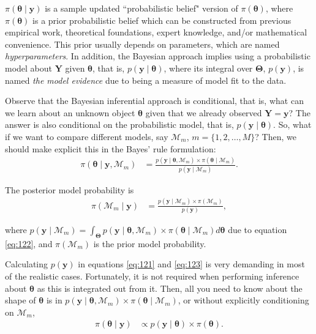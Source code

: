 \(\pi(\bm{\theta} \mid \mathbf{y})\) is a sample updated ``probabilistic belief" version of \(\pi(\bm{\theta})\), where \(\pi(\bm{\theta})\) is a prior probabilistic belief which can be constructed from previous empirical work, theoretical foundations, expert knowledge, and/or mathematical convenience. This prior usually depends on parameters, which are named \textit{hyperparameters}. In addition, the Bayesian approach implies using a probabilistic model about \(\mathbf{Y}\) given \(\bm{\theta}\), that is, \(p(\mathbf{y} \mid \bm{\theta})\), where its integral over \(\mathbf{\Theta}\), \(p(\mathbf{y})\), is named \textit{the model evidence} due to being a measure of model fit to the data.

Observe that the Bayesian inferential approach is conditional, that is, what can we learn about an unknown object \(\bm{\theta}\) given that we already observed \(\bm Y =\mathbf{y}\)? The answer is also conditional on the probabilistic model, that is, \(p(\mathbf{y} \mid \bm{\theta})\). So, what if we want to compare different models, say \(\mathcal{M}_m\), \(m = \{1,2,\dots,M\}\)? Then, we should make explicit this in the Bayes' rule formulation:
\begin{align}
	\pi(\bm{\theta}\mid \mathbf{y},\mathcal{M}_m)&=\frac{p(\mathbf{y}\mid \bm{\theta},\mathcal{M}_m) \times \pi(\bm{\theta}\mid \mathcal{M}_m)}{p(\mathbf{y}\mid \mathcal{M}_m)}.
	\label{eq:122}
\end{align}

The posterior model probability is
\begin{align}
	\pi(\mathcal{M}_m\mid \mathbf{y})&=\frac{p(\mathbf{y}\mid \mathcal{M}_m) \times \pi(\mathcal{M}_m)}{p(\mathbf{y})}, 
	\label{eq:123}
\end{align}

where $p(\mathbf{y}\mid \mathcal{M}_m)=\int_{\mathbf{\Theta}}p(\mathbf{y}\mid \bm{\theta},\mathcal{M}_m) \times \pi(\bm{\theta}\mid \mathcal{M}_m)d\bm{\theta}$ due to equation \ref{eq:122}, and $\pi(\mathcal{M}_m)$ is the prior model probability. 

Calculating \( p(\mathbf{y}) \) in equations \ref{eq:121} and \ref{eq:123} is very demanding in most of the realistic cases. Fortunately, it is not required when performing inference about \( \bm{\theta} \) as this is integrated out from it. Then, all you need to know about the shape of \( \bm{\theta} \) is in \( p(\mathbf{y} \mid \bm{\theta}, \mathcal{M}_m) \times \pi(\bm{\theta} \mid \mathcal{M}_m) \), or without explicitly conditioning on \( \mathcal{M}_m \),
\begin{align}
	\pi(\bm{\theta}\mid \mathbf{y})& \propto p(\mathbf{y}\mid \bm{\theta}) \times \pi(\bm{\theta}).
	\label{eq:124}
\end{align}

